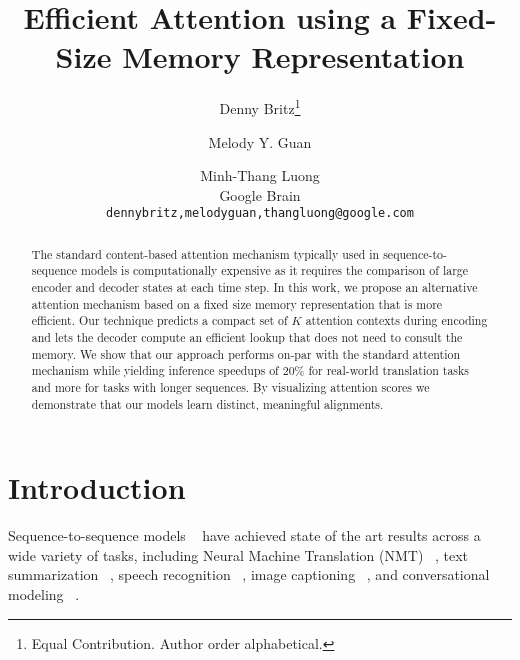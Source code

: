 \documentclass[11pt,letterpaper]{article}
\title{Efficient Attention using a Fixed-Size Memory Representation}
\author{
    Denny Britz\thanks{\hspace{0.1 cm}Equal Contribution. Author order alphabetical.} \and Melody Y. Guan\footnotemark[1] \and Minh{-}Thang Luong \\ Google Brain \\ \texttt{dennybritz,melodyguan,thangluong@google.com}
}
\date{}
\begin{document}
\maketitle

\begin{abstract} 
The standard content-based attention mechanism typically used in sequence-to-sequence models is computationally expensive as it requires the comparison of large encoder and decoder states at each time step. In this work, we propose an alternative attention mechanism based on a fixed size memory representation that is more efficient. Our technique predicts a compact set of $K$ attention contexts during encoding and lets the decoder compute an efficient lookup that does not need to consult the memory. We show that our approach performs on-par with the standard attention mechanism while yielding inference speedups of 20\% for real-world translation tasks and more for tasks with longer sequences. By visualizing attention scores we demonstrate that our models learn distinct, meaningful alignments.
\end{abstract}


\section{Introduction}
\label{sec:introduction}

Sequence-to-sequence models ~\cite{Sutskever:2014, Cho:2014} have achieved state of the art results across a wide variety of tasks, including Neural Machine Translation (NMT) ~\cite{Bahdanau:2014, Wu:2016}, text summarization ~\cite{Rush:2015, Nallapati:2016}, speech recognition ~\cite{Chan:2015, Jan:2016}, image captioning ~\cite{Xu:2015}, and conversational modeling ~\cite{Vinyals:2015, Li:2015}. 
\end{document}
